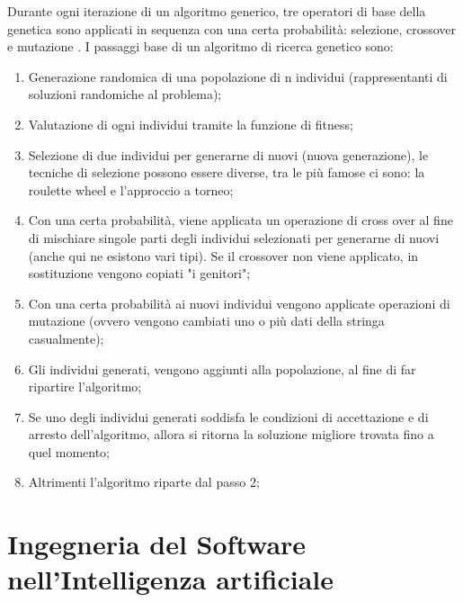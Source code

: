 Durante ogni iterazione di un algoritmo generico, tre operatori di base della genetica sono applicati in sequenza con una certa probabilità: selezione, crossover e mutazione \cite{geneticalgotihm} . I passaggi base di un algoritmo di ricerca genetico sono:
\begin{enumerate}
    \item Generazione randomica di una popolazione di n individui (rappresentanti di soluzioni randomiche al problema);
    \item Valutazione di ogni individui tramite la funzione di fitness;
    \item Selezione di due individui per generarne di nuovi (nuova generazione), le tecniche di selezione possono essere diverse, tra le più famose ci sono: la roulette wheel e l'approccio a torneo;
    \item Con una certa probabilità, viene applicata un operazione di cross over al fine di mischiare singole parti degli individui selezionati per generarne di nuovi (anche qui ne esistono vari tipi). Se il crossover non viene applicato, in sostituzione vengono copiati "i genitori";
    \item Con una certa  probabilità ai nuovi individui vengono applicate operazioni di mutazione (ovvero vengono cambiati uno o più dati della stringa casualmente);
    \item Gli individui generati, vengono aggiunti alla popolazione, al fine di far ripartire l'algoritmo;
    \item Se uno degli individui generati soddisfa le condizioni di accettazione e di arresto dell'algoritmo, allora si ritorna la soluzione migliore trovata fino a quel momento;
    \item Altrimenti l'algoritmo riparte dal passo 2;
    
\end{enumerate}


\section{Ingegneria del Software nell'Intelligenza artificiale}

